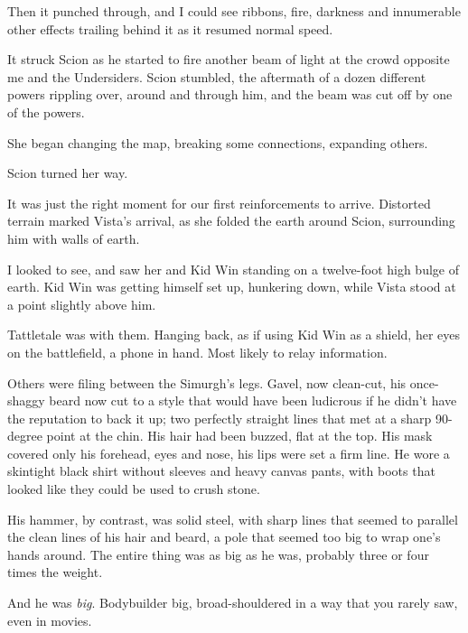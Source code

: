 Then it punched through, and I could see ribbons, fire, darkness and innumerable other effects trailing behind it as it resumed normal speed.



It struck Scion as he started to fire another beam of light at the crowd opposite me and the Undersiders.  Scion stumbled, the aftermath of a dozen different powers rippling over, around and through him, and the beam was cut off by one of the powers.



She began changing the map, breaking some connections, expanding others.



Scion turned her way.



It was just the right moment for our first reinforcements to arrive.  Distorted terrain marked Vista's arrival, as she folded the earth around Scion, surrounding him with walls of earth.



I looked to see, and saw her and Kid Win standing on a twelve-foot high bulge of earth.  Kid Win was getting himself set up, hunkering down, while Vista stood at a point slightly above him.



Tattletale was with them.  Hanging back, as if using Kid Win as a shield, her eyes on the battlefield, a phone in hand.  Most likely to relay information.



Others were filing between the Simurgh's legs.  Gavel, now clean-cut, his once-shaggy beard now cut to a style that would have been ludicrous if he didn't have the reputation to back it up; two perfectly straight lines that met at a sharp 90-degree point at the chin.  His hair had been buzzed, flat at the top.  His mask covered only his forehead, eyes and nose, his lips were set a firm line.  He wore a skintight black shirt without sleeves and heavy canvas pants, with boots that looked like they could be used to crush stone.



His hammer, by contrast, was solid steel, with sharp lines that seemed to parallel the clean lines of his hair and beard, a pole that seemed too big to wrap one's hands around.  The entire thing was as big as he was, probably three or four times the weight.



And he was \emph{big}.  Bodybuilder big, broad-shouldered in a way that you rarely saw, even in movies.



